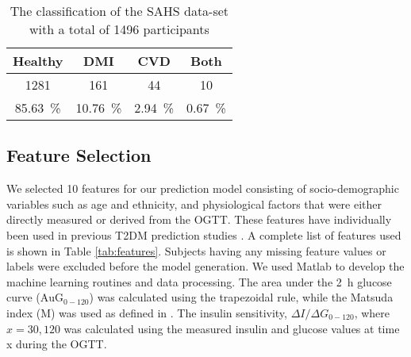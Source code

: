 \documentclass[a4paper,twoside]{article}
\begin{document}
\begin{table}[!htbp]
\centering
\begin{tabular}{c c c c}
\toprule
Healthy &  DMI & CVD & Both\\
\midrule \midrule
1281 & 161 & 44 & 10\\
\SI{85.63}{\percent} & \SI{10.76}{\percent} & \SI[round-precision=3]{2.94}{\percent} & \SI[round-precision=2]{0.67}{\percent} \\
\bottomrule
\end{tabular}
\caption{The classification of the SAHS data-set with a total of 1496 participants }
\label{tab:patients}
\end{table}
%
%
\subsection{Feature Selection}
%
We selected \num{10} features for our prediction model consisting of socio-demographic variables such as age and ethnicity, and physiological factors that were either directly measured or derived from the OGTT. These features have individually been used in previous T2DM prediction studies \cite{abdul-ghani_what_2007,abdul-ghani_plasma_2009}. A complete list of features used is shown in Table \ref{tab:features}. Subjects having any missing feature values or labels were excluded before the model generation. We used Matlab to develop the machine learning routines and data processing.  The area under the \SI{2}{\hour} glucose curve ($\textrm{AuG}_{0-120}$) was calculated using the trapezoidal rule, while the Matsuda index (M) was used as defined in \cite{Matsuda1462}. The insulin sensitivity, \( {\Delta I}/{\Delta G}_{0-120} \), where $x = 30, 120$ was calculated using the measured insulin and glucose values at time x during the OGTT.
\end{document}
